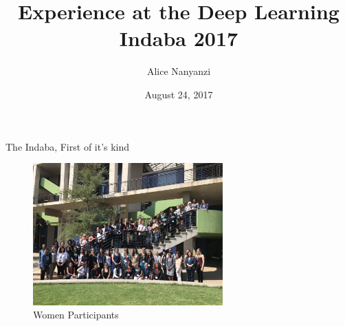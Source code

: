\documentclass{beamer}
\title[Indaba 2017]{Experience at the Deep Learning Indaba 2017} %
\author{Alice Nanyanzi} %
\institute{} %
\date{August 24, 2017} %
\begin{document}
\begin{frame}
\titlepage %
\end{frame}

\begin{frame}{The Indaba, First of it's kind}
		\begin{figure}
		\includegraphics[width=0.65\textwidth]{indabafemale.jpg}
		\caption{ Women Participants}
	\end{figure}
	
\end{frame}
\end{document}
